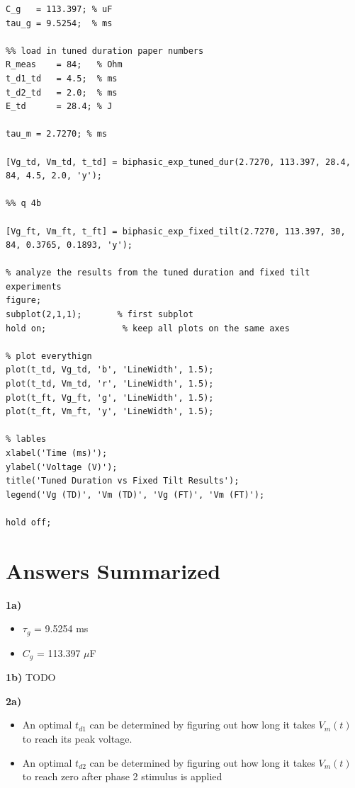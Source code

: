 \documentclass[]{report}
\begin{document}
\begin{lstlisting}[style=Matlab-editor, backgroundcolor=\color{smoky},  basicstyle=\ttfamily\tiny]
%% load in previously found C-g tau-g
C_g   = 113.397; % uF
tau_g = 9.5254;  % ms

%% load in tuned duration paper numbers
R_meas    = 84;   % Ohm
t_d1_td   = 4.5;  % ms
t_d2_td   = 2.0;  % ms
E_td      = 28.4; % J

tau_m = 2.7270; % ms

[Vg_td, Vm_td, t_td] = biphasic_exp_tuned_dur(2.7270, 113.397, 28.4, 84, 4.5, 2.0, 'y');

%% q 4b

[Vg_ft, Vm_ft, t_ft] = biphasic_exp_fixed_tilt(2.7270, 113.397, 30, 84, 0.3765, 0.1893, 'y');

% analyze the results from the tuned duration and fixed tilt experiments
figure;
subplot(2,1,1);       % first subplot
hold on;               % keep all plots on the same axes

% plot everythign
plot(t_td, Vg_td, 'b', 'LineWidth', 1.5);
plot(t_td, Vm_td, 'r', 'LineWidth', 1.5);
plot(t_ft, Vg_ft, 'g', 'LineWidth', 1.5);
plot(t_ft, Vm_ft, 'y', 'LineWidth', 1.5);

% lables
xlabel('Time (ms)');
ylabel('Voltage (V)');
title('Tuned Duration vs Fixed Tilt Results');
legend('Vg (TD)', 'Vm (TD)', 'Vg (FT)', 'Vm (FT)');

hold off;
\end{lstlisting}

\chapter*{Answers Summarized}

\textbf{1a)}
\begin{itemize}
	\item $\tau_g$ = 9.5254 ms
	\item $C_g$ = 113.397 $\mu$F
\end{itemize}

\textbf{1b)}
TODO

\textbf{2a)}
\begin{itemize}
	\item An optimal $t_{d1}$ can be determined by figuring out how long it takes $V_m(t)$ to reach its peak voltage.
	\item An optimal $t_{d2}$ can be determined by figuring out how long it takes $V_m(t)$ to reach zero after phase 2 stimulus is applied
\end{itemize}
\end{document}
